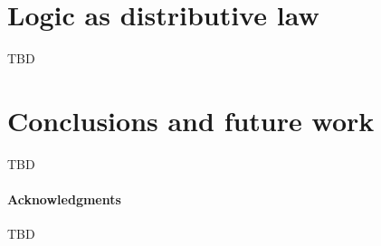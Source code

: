 \documentclass[]{acm_proc_article-sp}
\numberwithin{equation}{subsection}
\begin{document}
\section{Logic as distributive law}

TBD

\section{Conclusions and future work}

TBD

\paragraph{Acknowledgments}

TBD







\end{document}
